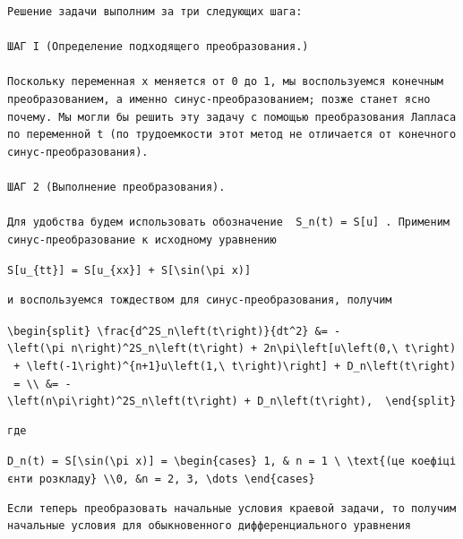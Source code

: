 \documentclass[
  ukrainian,
]{article}
\begin{document}
\begin{verbatim}
Решение задачи выполним за три следующих шага:

ШАГ І (Определение подходящего преобразования.)

Поскольку переменная x меняется от 0 до 1, мы воспользуемся конечным преобразованием, а именно синус-преобразованием; позже станет ясно почему. Мы могли бы решить эту задачу с помощью преобразования Лапласа по переменной t (по трудоемкости этот метод не отличается от конечного синус-преобразования).

ШАГ 2 (Выполнение преобразования).

Для удобства будем использовать обозначение  S_n(t) = S[u] . Применим синус-преобразование к исходному уравнению
\end{verbatim}

\texttt{S{[}u\_\{tt\}{]}\ =\ S{[}u\_\{xx\}{]}\ +\ S{[}\textbackslash{}sin(\textbackslash{}pi\ x){]}}

\begin{verbatim}
и воспользуемся тождеством для синус-преобразования, получим
\end{verbatim}

\texttt{\textbackslash{}begin\{split\}\ \textbackslash{}frac\{d\^{}2S\_n\textbackslash{}left(t\textbackslash{}right)\}\{dt\^{}2\}\ \&=\ -\textbackslash{}left(\textbackslash{}pi\ n\textbackslash{}right)\^{}2S\_n\textbackslash{}left(t\textbackslash{}right)\ +\ 2n\textbackslash{}pi\textbackslash{}left{[}u\textbackslash{}left(0,\textbackslash{}\ t\textbackslash{}right)\ +\ \textbackslash{}left(-1\textbackslash{}right)\^{}\{n+1\}u\textbackslash{}left(1,\textbackslash{}\ t\textbackslash{}right)\textbackslash{}right{]}\ +\ D\_n\textbackslash{}left(t\textbackslash{}right)\ =\ \textbackslash{}\textbackslash{}\ \&=\ -\textbackslash{}left(n\textbackslash{}pi\textbackslash{}right)\^{}2S\_n\textbackslash{}left(t\textbackslash{}right)\ +\ D\_n\textbackslash{}left(t\textbackslash{}right),\ \ \textbackslash{}end\{split\}}

\begin{verbatim}
где
\end{verbatim}

\texttt{D\_n(t)\ =\ S{[}\textbackslash{}sin(\textbackslash{}pi\ x){]}\ =\ \textbackslash{}begin\{cases\}\ 1,\ \&\ n\ =\ 1\ \textbackslash{}\ \textbackslash{}text\{(це\ коефіцієнти\ розкладу\}\ \textbackslash{}\textbackslash{}0,\ \&n\ =\ 2,\ 3,\ \textbackslash{}dots\ \textbackslash{}end\{cases\}}

\begin{verbatim}
Если теперь преобразовать начальные условия краевой задачи, то получим начальные условия для обыкновенного дифференциального уравнения
\end{verbatim}
\end{document}
